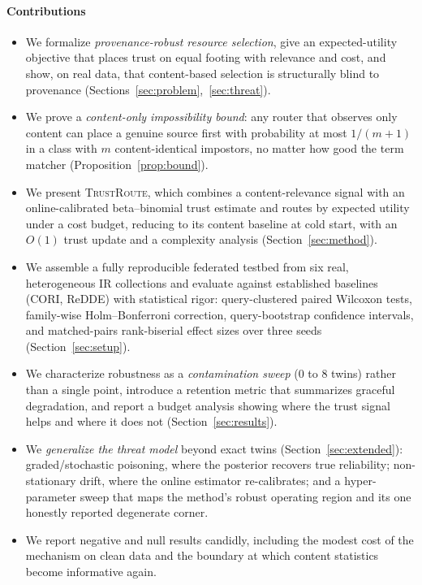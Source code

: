 \documentclass[preprint,12pt]{elsarticle}
\newcommand{\system}{\textsc{TrustRoute}}
\begin{document}
\paragraph*{Contributions}
\begin{itemize}
\item We formalize \emph{provenance-robust resource selection}, give an
expected-utility objective that places trust on equal footing with relevance and
cost, and show, on real data, that content-based selection is structurally blind
to provenance (Sections~\ref{sec:problem},~\ref{sec:threat}).
\item We prove a \emph{content-only impossibility bound}: any router that observes
only content can place a genuine source first with probability at most $1/(m{+}1)$
in a class with $m$ content-identical impostors, no matter how good the term
matcher (Proposition~\ref{prop:bound}).
\item We present \system, which combines a content-relevance signal with an
online-calibrated beta--binomial trust estimate and routes by expected utility
under a cost budget, reducing to its content baseline at cold start, with an
$O(1)$ trust update and a complexity analysis (Section~\ref{sec:method}).
\item We assemble a fully reproducible federated testbed from six real,
heterogeneous IR collections and evaluate against established baselines (CORI,
ReDDE) with statistical rigor: query-clustered paired Wilcoxon tests,
family-wise Holm--Bonferroni correction, query-bootstrap confidence intervals,
and matched-pairs rank-biserial effect sizes over three seeds
(Section~\ref{sec:setup}).
\item We characterize robustness as a \emph{contamination sweep} ($0$ to $8$
twins) rather than a single point, introduce a retention metric that summarizes
graceful degradation, and report a budget analysis showing where the trust
signal helps and where it does not (Section~\ref{sec:results}).
\item We \emph{generalize the threat model} beyond exact twins
(Section~\ref{sec:extended}): graded/stochastic poisoning, where the posterior
recovers true reliability; non-stationary drift, where the online estimator
re-calibrates; and a hyper-parameter sweep that maps the method's robust
operating region and its one honestly reported degenerate corner.
\item We report negative and null results candidly, including the modest cost of
the mechanism on clean data and the boundary at which content statistics become
informative again.
\end{itemize}
\end{document}
